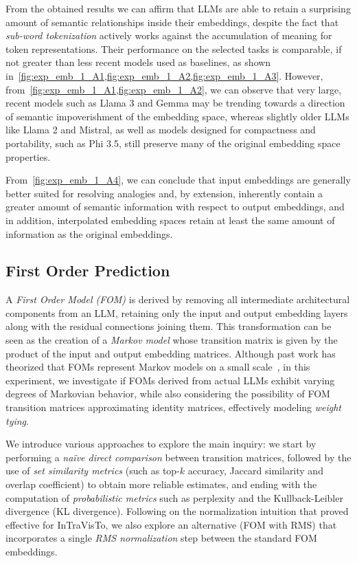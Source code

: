 \documentclass[11pt,a4paper,twocolumn]{article}
\begin{document}
From the obtained results we can affirm that LLMs are able to retain a surprising amount of semantic relationships inside their embeddings, despite the fact that \emph{sub-word tokenization} actively works against the accumulation of meaning for token representations.
Their performance on the selected tasks is comparable, if not greater than less recent models used as baselines, as shown in~\cref{fig:exp_emb_1_A1,fig:exp_emb_1_A2,fig:exp_emb_1_A3}.
However, from~\cref{fig:exp_emb_1_A1,fig:exp_emb_1_A2}, we can observe that very large, recent models such as Llama 3 and Gemma may be trending towards a direction of semantic impoverishment of the embedding space, whereas slightly older LLMs like Llama 2 and Mistral, as well as models designed for compactness and portability, such as Phi 3.5, still preserve many of the original embedding space properties.

From~\cref{fig:exp_emb_1_A4}, we can conclude that input embeddings are generally better suited for resolving analogies and, by extension, inherently contain a greater amount of semantic information with respect to output embeddings, and in addition, interpolated embedding spaces retain at least the same amount of information as the original embeddings.

\subsection{First Order Prediction}

A \emph{First Order Model (FOM)} is derived by removing all intermediate architectural components from an LLM, retaining only the input and output embedding layers along with the residual connections joining them.
This transformation can be seen as the creation of a \emph{Markov model} whose transition matrix is given by the product of the input and output embedding matrices.
Although past work has theorized that FOMs represent Markov models on a small scale~\cite{elhage2021}, in this experiment, we investigate if FOMs derived from actual LLMs exhibit varying degrees of Markovian behavior, while also considering the possibility of FOM transition matrices approximating identity matrices, effectively modeling \emph{weight tying}.

We introduce various approaches to explore the main inquiry: we start by performing a \emph{naïve direct comparison} between transition matrices, followed by the use of \emph{set similarity metrics} (such as top-$k$ accuracy, Jaccard similarity and overlap coefficient) to obtain more reliable estimates, and ending with the computation of \emph{probabilistic metrics} such as perplexity and the Kullback-Leibler divergence (KL divergence).
Following on the normalization intuition that proved effective for InTraVisTo, we also explore an alternative (FOM with RMS) that incorporates a single \emph{RMS normalization} step between the standard FOM embeddings.
\end{document}
